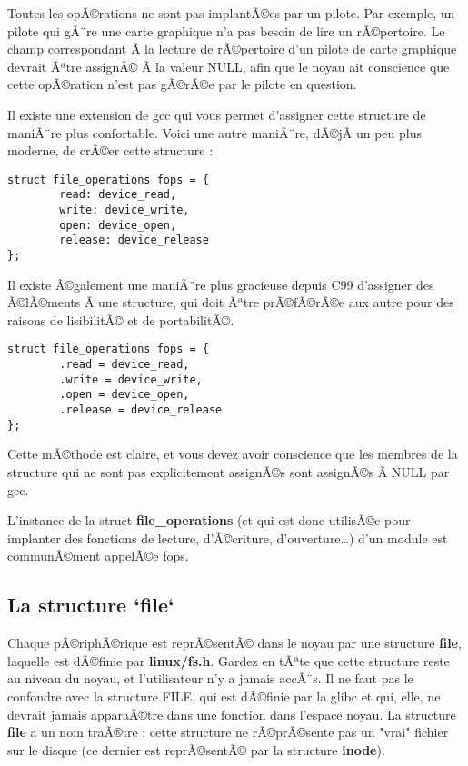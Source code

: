 \documentclass[11pt]{article}
\begin{document}
Toutes les opÃ©rations ne sont pas implantÃ©es par un pilote. Par exemple, un pilote qui gÃ¨re une carte graphique n'a pas besoin de lire un rÃ©pertoire. Le champ correspondant Ã  la lecture de rÃ©pertoire d'un pilote de carte graphique devrait Ãªtre assignÃ© Ã  la valeur NULL, afin que le noyau ait conscience que cette opÃ©ration n'est pas gÃ©rÃ©e par le pilote en question.

Il existe une extension de gcc qui vous permet d'assigner cette structure de maniÃ¨re plus confortable. Voici une autre maniÃ¨re, dÃ©jÃ  un peu plus moderne, de crÃ©er cette structure :

\begin{verbatim}
struct file_operations fops = {
        read: device_read,
        write: device_write,
        open: device_open,
        release: device_release
};
\end{verbatim}

Il existe Ã©galement une maniÃ¨re plus gracieuse depuis C99 d'assigner des Ã©lÃ©ments Ã  une structure, qui doit Ãªtre prÃ©fÃ©rÃ©e aux autre pour des raisons de lisibilitÃ© et de portabilitÃ©.

\begin{verbatim}
struct file_operations fops = {
        .read = device_read,
        .write = device_write,
        .open = device_open,
        .release = device_release
};
\end{verbatim}

Cette mÃ©thode est claire, et vous devez avoir conscience que les membres de la structure qui ne sont pas explicitement assignÃ©s sont assignÃ©s Ã  NULL par gcc.

L'instance de la struct \textbf{file\_operations} (et qui est donc utilisÃ©e pour implanter des fonctions de lecture, d'Ã©criture, d'ouverture\ldots{}) d'un module est communÃ©ment appelÃ©e fops.

\subsection*{La structure `file`}
\label{sec-6-2}

Chaque pÃ©riphÃ©rique est reprÃ©sentÃ© dans le noyau par une structure \textbf{file}, laquelle est dÃ©finie par \textbf{linux/fs.h}. Gardez en tÃªte que cette structure reste au niveau du noyau, et l'utilisateur n'y a jamais accÃ¨s. Il ne faut pas le confondre avec la structure FILE, qui est dÃ©finie par la glibc et qui, elle, ne devrait jamais apparaÃ®tre dans une fonction dans l'espace noyau. La structure \textbf{file} a un nom traÃ®tre : cette structure ne rÃ©prÃ©sente pas un "vrai" fichier sur le disque (ce dernier est reprÃ©sentÃ© par la structure \textbf{inode}).
\end{document}
